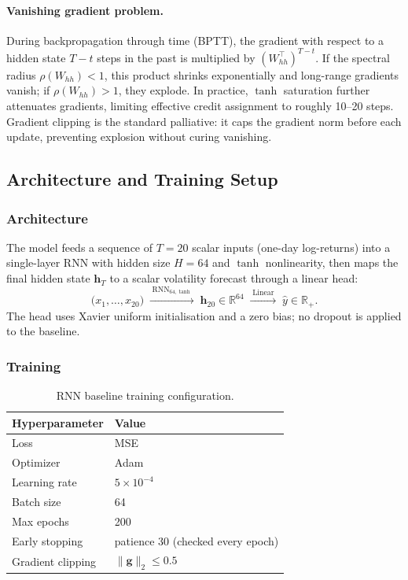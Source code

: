\paragraph{Vanishing gradient problem.}
During backpropagation through time (BPTT), the gradient with respect to a
hidden state $T-t$ steps in the past is multiplied by $(W_{hh}^\top)^{T-t}$.
If the spectral radius $\rho(W_{hh}) < 1$, this product shrinks
exponentially and long-range gradients vanish; if $\rho(W_{hh}) > 1$, they
explode. In practice, $\tanh$ saturation further attenuates gradients, limiting
effective credit assignment to roughly 10--20 steps.
Gradient clipping is the standard palliative: it caps the gradient norm before
each update, preventing explosion without curing vanishing.

\subsection{Architecture and Training Setup}

\subsubsection*{Architecture}

The model feeds a sequence of $T = 20$ scalar inputs (one-day log-returns)
into a single-layer RNN with hidden size $H = 64$ and $\tanh$ nonlinearity,
then maps the final hidden state $\mathbf{h}_T$ to a scalar volatility
forecast through a linear head:
\[
  \bigl(x_1, \ldots, x_{20}\bigr)
  \;\xrightarrow{\;\text{RNN}_{64,\tanh}\;}\;
  \mathbf{h}_{20} \in \mathbb{R}^{64}
  \;\xrightarrow{\;\text{Linear}\;}\;
  \hat{y} \in \mathbb{R}_{+}.
\]
The head uses Xavier uniform initialisation and a zero bias; no dropout is
applied to the baseline.

\subsubsection*{Training}

\begin{table}[H]
  \centering
  \caption{RNN baseline training configuration.}
  \label{tab:rnn_training}
  \begin{tabular}{ll}
    \toprule
    Hyperparameter & Value \\
    \midrule
    Loss                & MSE \\
    Optimizer           & Adam \\
    Learning rate       & $5 \times 10^{-4}$ \\
    Batch size          & 64 \\
    Max epochs          & 200 \\
    Early stopping      & patience 30 (checked every epoch) \\
    Gradient clipping   & $\|\mathbf{g}\|_2 \leq 0.5$ \\
    \bottomrule
  \end{tabular}
\end{table}

